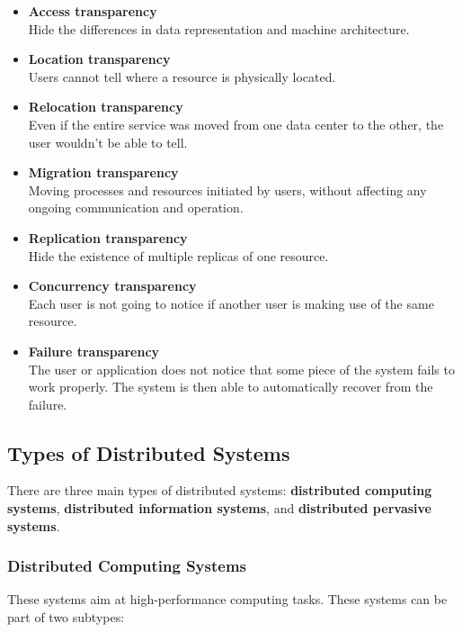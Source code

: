 \documentclass{article}
\begin{document}
\begin{itemize}
	\item \textbf{Access transparency} \\
	Hide the differences in data representation and machine architecture.
	
	\item \textbf{Location transparency} \\
	Users cannot tell where a resource is physically located.
	
	\item \textbf{Relocation transparency} \\
	Even if the entire service was moved from one data center to the other, the user wouldn't be able to tell.
	
	\item \textbf{Migration transparency} \\
	Moving processes and resources initiated by users, without affecting any ongoing communication and operation.
	
	\item \textbf{Replication transparency} \\
	Hide the existence of multiple replicas of one resource.
	
	\item \textbf{Concurrency transparency} \\
	Each user is not going to notice if another user is making use of the same resource.
	
	\item \textbf{Failure transparency} \\
	The user or application does not notice that some piece of the system fails to work properly. The system is then able to automatically recover from the failure.
\end{itemize}

\subsection{Types of Distributed Systems}
There are three main types of distributed systems: \textbf{distributed computing systems}, \textbf{distributed information systems}, and \textbf{distributed pervasive systems}.

\subsubsection{Distributed Computing Systems}
These systems aim at high-performance computing tasks. These systems can be part of two subtypes:
\end{document}
